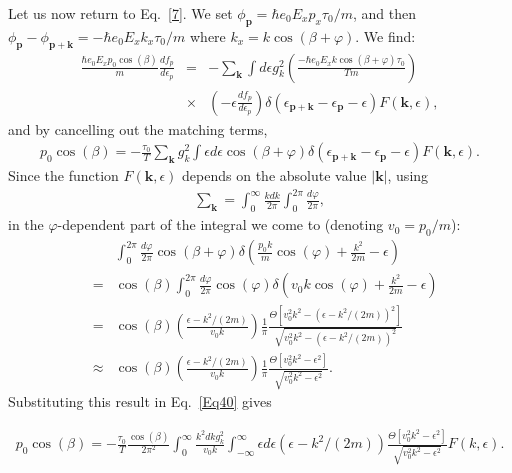 Let us now return to Eq.~\eqref{7}.
We set $\phi_\mathbf{p}=\hbar e_0E_xp_x\tau_0/m$,
and then $\phi_\mathbf{p}-\phi_{\mathbf{p}+\mathbf{k}}=-\hbar e_0E_xk_x\tau_0/m$ where $k_x=k\cos(\beta+\varphi)$.
We find:
%
\begin{eqnarray}
\frac{\hbar e_0E_xp_0\cos(\beta)}{m}\frac{df_p}{d\epsilon_p} &=&-\sum_{\mathbf{k}}\int d\epsilon g_k^2\left(\frac{-\hbar e_0E_xk\cos(\beta+\varphi)\tau_0}{Tm}\right) \\ \nonumber
&\times&\left(-\epsilon\frac{df_p}{d\epsilon_p}\right)\delta(\epsilon_{\mathbf{p}+\mathbf{k}}-\epsilon_{\mathbf{p}}-\epsilon)F(\mathbf{k},\epsilon),
\end{eqnarray}
%
and by cancelling out the matching terms,
%
\begin{eqnarray}
\label{Eq40}
p_0\cos(\beta)
=
-\frac{\tau_0}{T}\sum_{\mathbf{k}}g_k^2\int \epsilon d\epsilon \cos(\beta+\varphi)
\delta(\epsilon_{\mathbf{p}+\mathbf{k}}-\epsilon_{\mathbf{p}}-\epsilon)F(\mathbf{k},\epsilon).
\end{eqnarray}
%
Since the function $F(\mathbf{k},\epsilon)$ depends on the absolute value $|\mathbf{k}|$, using
%
\begin{eqnarray}
\sum_{\mathbf{k}}=\int_0^\infty \frac{kdk}{2\pi}\int_0^{2\pi}\frac{d\varphi}{2\pi},
\end{eqnarray}
%
in the $\varphi$-dependent part of the integral we come to (denoting $v_0=p_0/m$):
%
\begin{eqnarray}
&{}&{}\int_0^{2\pi}\frac{d\varphi}{2\pi}\cos(\beta+\varphi)
\delta\left(\frac{p_0k}{m}\cos(\varphi)+\frac{k^2}{2m}-\epsilon\right) \\ \nonumber
&=&
\cos(\beta)\int_0^{2\pi}\frac{d\varphi}{2\pi}\cos(\varphi)
\delta\left(v_0k\cos(\varphi)+\frac{k^2}{2m}-\epsilon\right)
\\
\nonumber
&=&
\cos(\beta)
\left(\frac{\epsilon-k^2/(2m)}{v_0k}\right)
\frac{1}{\pi}
\frac{\Theta[v_0^2k^2-(\epsilon-k^2/(2m))^2]}{\sqrt{v_0^2k^2-(\epsilon-k^2/(2m))^2}} \\ \nonumber
&\approx&
\cos(\beta)
\left(\frac{\epsilon-k^2/(2m)}{v_0k}\right)
\frac{1}{\pi}
\frac{\Theta[v_0^2k^2-\epsilon^2]}{\sqrt{v_0^2k^2-\epsilon^2}}.
\end{eqnarray}
%
Substituting this result in Eq.~\eqref{Eq40} gives
%
\begin{footnotesize}
\begin{eqnarray}
p_0\cos(\beta)
=
-\frac{\tau_0}{T}
\frac{\cos(\beta)}{2\pi^2}
\int_0^\infty \frac{k^2dkg_k^2}{v_0k}\int_{-\infty}^\infty \epsilon d\epsilon \left(\epsilon-k^2/(2m)\right)
\frac{\Theta[v_0^2k^2-\epsilon^2]}{\sqrt{v_0^2k^2-\epsilon^2}}
F(k,\epsilon).
\end{eqnarray}
\end{footnotesize}
